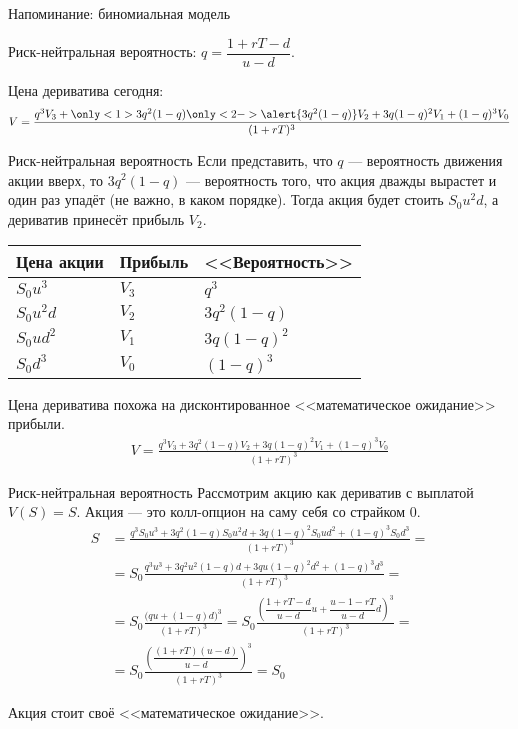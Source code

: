 \documentclass{beamer}
\begin{document}
\begin{frame}{Напоминание: биномиальная модель}

\justify
Риск-нейтральная вероятность: $q = \dfrac{1 + rT - d}{u - d}$.

\justify
Цена дериватива сегодня:
\begin{align*}
V = \frac{q^3V_3 + \only<1>{3q^2(1-q)}\only<2->{\alert{3q^2(1-q)}}V_2 + 3q(1-q)^2V_1 + (1-q)^3V_0}{(1+rT)^3}
\end{align*}
\end{frame}



\begin{frame}{Риск-нейтральная вероятность}
\justify
Если представить, что $q$ --- вероятность движения акции вверх, то $3q^2(1-q)$ --- вероятность того, что акция дважды вырастет и один раз упадёт (не важно, в каком порядке). Тогда акция будет стоить $S_0u^2d$, а дериватив принесёт прибыль $V_2$.

\justify
\centering
\begin{tabular}{l|l|l}
Цена акции & Прибыль & <<Вероятность>> \\ \hline
$S_0u^3$   & $V_3$   & $q^3$ \\
$S_0u^2d$  & $V_2$   & $3q^2(1-q)$ \\
$S_0ud^2$  & $V_1$   & $3q(1-q)^2$ \\ 
$S_0d^3$   & $V_0$   & $(1-q)^3$ 
\end{tabular}

\justify
Цена дериватива похожа на дисконтированное <<математическое ожидание>> прибыли.
\begin{align*}
V = \frac{q^3V_3 + 3q^2(1-q)V_2 + 3q(1-q)^2V_1 + (1-q)^3V_0}{(1+rT)^3}
\end{align*}
\end{frame}



\begin{frame}{Риск-нейтральная вероятность}
\justify
Рассмотрим акцию как дериватив с выплатой $V(S) = S$. Акция --- это колл-опцион на саму себя со страйком 0.
\begin{align*}
S &= \frac{q^3S_0u^3 + 3q^2(1-q)S_0u^2d + 3q(1-q)^2S_0ud^2 + (1-q)^3S_0d^3}{(1+rT)^3} = \\
&= S_0\frac{q^3u^3 + 3q^2u^2(1-q)d + 3qu(1-q)^2d^2 + (1-q)^3d^3}{(1+rT)^3} = \\
&= S_0\frac{\Big(qu + (1-q)d \Big)^3}{(1+rT)^3} 
= S_0\frac{\left(\dfrac{1+rT-d}{u-d}u + \dfrac{u-1-rT}{u-d}d \right)^3}{(1+rT)^3} = \\
&= S_0 \frac{\left(\dfrac{(1+rT)(u-d)}{u-d} \right)^3}{(1+rT)^3} = S_0
\end{align*}

\justify
Акция стоит своё <<математическое ожидание>>.
\end{frame}
\end{document}
